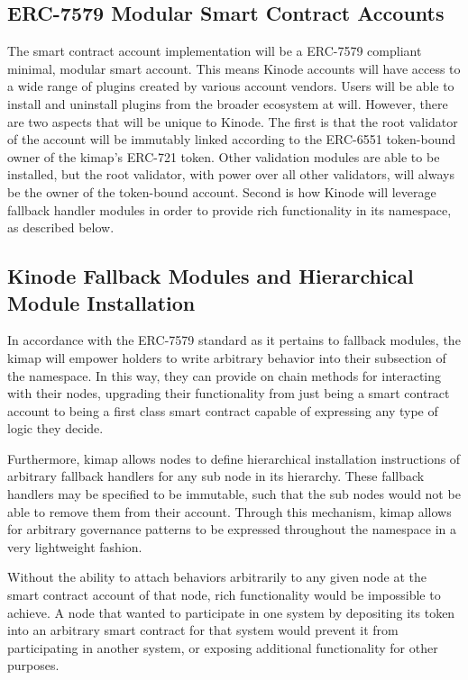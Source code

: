 \documentclass[runningheads]{llncs}
\begin{document}
\subsection{ERC-7579 Modular Smart Contract Accounts}

The smart contract account implementation will be a ERC-7579 compliant minimal, modular smart account.
This means Kinode accounts will have access to a wide range of plugins created by various account vendors.
Users will be able to install and uninstall plugins from the broader ecosystem at will.
However, there are two aspects that will be unique to Kinode. The first is that the root validator of the account
will be immutably linked according to the ERC-6551 token-bound owner of the kimap's ERC-721 token.
Other validation modules are able to be installed, but the root validator, with power over all other validators, will always be the owner of the token-bound account.
Second is how Kinode will leverage fallback handler modules in order to provide rich functionality in its namespace,
as described below.

\subsection{Kinode Fallback Modules and Hierarchical Module Installation}

In accordance with the ERC-7579 standard as it pertains to fallback modules, the kimap will empower holders
to write arbitrary behavior into their subsection of the namespace.
In this way, they can provide on chain methods for interacting with their nodes, upgrading their functionality
from just being a smart contract account to being a first class smart contract capable of expressing any type of
logic they decide.

Furthermore, kimap allows nodes to define hierarchical installation instructions of arbitrary fallback handlers for any sub node in its hierarchy.
These fallback handlers may be specified to be immutable, such that the sub nodes would not be able to remove them from their account.
Through this mechanism, kimap allows for arbitrary governance patterns to be expressed throughout the namespace in a very lightweight fashion.

Without the ability to attach behaviors arbitrarily to any given node at the smart contract account of that node, rich functionality would be impossible to achieve.
A node that wanted to participate in one system by depositing its token into an arbitrary smart contract for that system would prevent it from participating in another system, or exposing additional functionality for other purposes.
\end{document}
